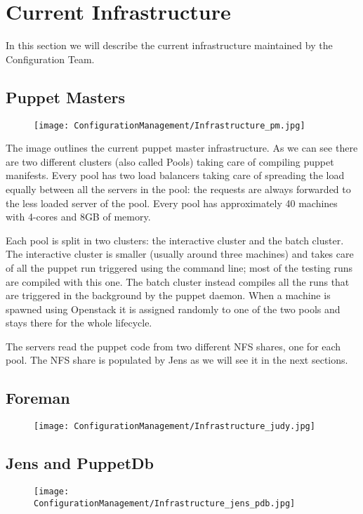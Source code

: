 \section{Current Infrastructure}

In this section we will describe the current infrastructure maintained by
the Configuration Team.

\subsection{Puppet Masters}


\begin{figure}[H]
\texttt{[image: ConfigurationManagement/Infrastructure\_pm.jpg]}
\end{figure}

The image outlines the current puppet master infrastructure. As we can see
there are two different clusters (also called Pools) taking care of
compiling puppet manifests. Every pool has two load balancers taking care
of spreading the load equally between all the servers in the pool: the
requests are always forwarded to the less loaded server of the pool. Every
pool has approximately 40 machines with 4-cores and 8GB of memory.

Each pool is split in two clusters: the interactive cluster and the batch
cluster. The interactive cluster is smaller (usually around three
machines) and takes care of all the puppet run triggered using the command
line; most of the testing runs are compiled with this one. The batch
cluster instead compiles all the runs that are triggered in the background
by the puppet daemon. When a machine is spawned using Openstack it is
assigned randomly to one of the two pools and stays there for the whole
lifecycle.

The servers read the puppet code from two different NFS shares, one for
each pool. The NFS share is populated by Jens as we will see it in the
next sections.

\subsection{Foreman}

\begin{figure}[H]
\texttt{[image: ConfigurationManagement/Infrastructure\_judy.jpg]}
\end{figure}

\subsection{Jens and PuppetDb}

\begin{figure}[H]
\texttt{[image: ConfigurationManagement/Infrastructure\_jens\_pdb.jpg]}
\end{figure}
